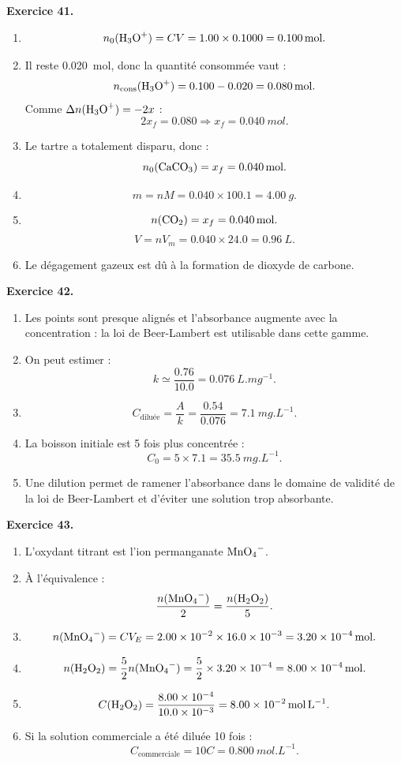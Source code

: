 \documentclass[11pt,a4paper]{article}
\newcommand{\corr}[2]{
  \begin{correctionbox}
  \textbf{Exercice #1.} #2
  \end{correctionbox}
}
\begin{document}
\corr{41}{
\begin{enumerate}
  \item
  \[
  n_0(\ce{H3O+})=CV=1.00\times 0.1000=\SI{0.100}{mol}.
  \]
  \item Il reste \SI{0.020}{mol}, donc la quantité consommée vaut :
  \[
  n_{\text{cons}}(\ce{H3O+})=0.100-0.020=\SI{0.080}{mol}.
  \]
  Comme $\Delta n(\ce{H3O+})=-2x$ :
  \[
  2x_f=0.080 \Rightarrow x_f=\SI{0.040}{mol}.
  \]
  \item Le tartre a totalement disparu, donc :
  \[
  n_0(\ce{CaCO3})=x_f=\SI{0.040}{mol}.
  \]
  \item
  \[
  m= nM=0.040\times 100.1=\SI{4.00}{g}.
  \]
  \item
  \[
  n(\ce{CO2})=x_f=\SI{0.040}{mol}.
  \]
  \[
  V=nV_m=0.040\times 24.0=\SI{0.96}{L}.
  \]
  \item Le dégagement gazeux est dû à la formation de dioxyde de carbone.
\end{enumerate}
}

\corr{42}{
\begin{enumerate}
  \item Les points sont presque alignés et l'absorbance augmente avec la concentration : la loi de Beer-Lambert est utilisable dans cette gamme.
  \item On peut estimer :
  \[
  k\simeq \frac{0.76}{10.0}=\SI{0.076}{L.mg^{-1}}.
  \]
  \item
  \[
  C_{\text{diluée}}=\frac{A}{k}=\frac{0.54}{0.076}=\SI{7.1}{mg.L^{-1}}.
  \]
  \item La boisson initiale est 5 fois plus concentrée :
  \[
  C_0=5\times 7.1=\SI{35.5}{mg.L^{-1}}.
  \]
  \item Une dilution permet de ramener l'absorbance dans le domaine de validité de la loi de Beer-Lambert et d'éviter une solution trop absorbante.
\end{enumerate}
}

\corr{43}{
\begin{enumerate}
  \item L'oxydant titrant est l'ion permanganate $\ce{MnO4-}$.
  \item À l'équivalence :
  \[
  \frac{n(\ce{MnO4-})}{2}=\frac{n(\ce{H2O2})}{5}.
  \]
  \item
  \[
  n(\ce{MnO4-})=CV_E=2.00\times 10^{-2}\times 16.0\times 10^{-3}
  =\SI{3.20e-4}{mol}.
  \]
  \item
  \[
  n(\ce{H2O2})=\frac{5}{2}n(\ce{MnO4-})
  =\frac{5}{2}\times 3.20\times 10^{-4}
  =\SI{8.00e-4}{mol}.
  \]
  \item
  \[
  C(\ce{H2O2})=\frac{8.00\times 10^{-4}}{10.0\times 10^{-3}}
  =\SI{8.00e-2}{mol.L^{-1}}.
  \]
  \item Si la solution commerciale a été diluée 10 fois :
  \[
  C_{\text{commerciale}}=10C=\SI{0.800}{mol.L^{-1}}.
  \]
\end{enumerate}
}
\end{document}
